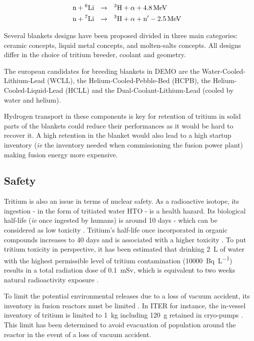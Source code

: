 \begin{align}
    \text{n} + \text{\textsuperscript{6}Li}  \ \ &\xrightarrow{} \ \ \text{\textsuperscript{3}H} + \alpha + \SI{4.8}{MeV}\\
    \text{n} + \text{\textsuperscript{7}Li}  \ \ &\xrightarrow{} \ \ \text{\textsuperscript{3}H} + \alpha + \text{n}' - \SI{2.5}{MeV} 
\end{align}

Several blankets designs have been proposed divided in three main categories: ceramic concepts, liquid metal concepts, and molten-salts concepts.
All designs differ in the choice of tritium breeder, coolant and geometry.

The european candidates for breeding blankets in DEMO are the Water-Cooled-Lithium-Lead (WCLL), the Helium-Cooled-Pebble-Bed (HCPB), the Helium-Cooled-Liquid-Lead (HCLL) and the Dual-Coolant-Lithium-Lead (cooled by water and helium).

Hydrogen transport in these components is key for retention of tritium in solid parts of the blankets could reduce their performances as it would be hard to recover it.
A high retention in the blanket would also lead to a high startup inventory (\textit{ie} the inventory needed when commissioning the fusion power plant) making fusion energy more expensive.

\subsection{Safety}
Tritium is also an issue in terms of nuclear safety.
As a radioactive isotope, its ingestion - in the form of tritiated water HTO - is a health hazard.
Its biological half-life (\textit{ie} once ingested by humans) is around 10 days - which can be considered as low toxicity .
Tritium's half-life once incorporated in organic compounds increases to 40 days and is associated with a higher toxicity \cite{bridges_review_2007}.
To put tritium toxicity in perspective, it has been estimated that drinking \SI{2}{L} of water with the highest permissible level of tritium contamination (\SI{10000}{Bq.L^{-1}}) results in a total radiation dose of \SI{0.1}{mSv}, which is equivalent to two weeks natural radioactivity exposure .

To limit the potential environmental releases due to a loss of vacuum accident, its inventory in fusion reactors must be limited .
In ITER for instance, the in-vessel inventory of tritium is limited to \SI{1}{kg} including \SI{120}{g} retained in cryo-pumps .
This limit has been determined to avoid evacuation of population around the reactor in the event of a loss of vacuum accident.

